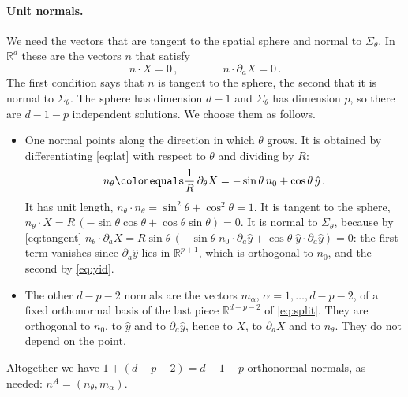 \documentclass[a4paper,11pt]{article}
\begin{document}
\paragraph{Unit normals.}
We need the vectors that are tangent to the spatial sphere and normal to $\Sigma_\theta$. In $\mathbb{R}^d$ these are the vectors $n$ that satisfy
\begin{equation}\label{eq:normalcond}
	n\cdot X=0\, ,\qquad\qquad n\cdot\partial_aX=0\, .
\end{equation}
The first condition says that $n$ is tangent to the sphere, the second that it is normal to $\Sigma_\theta$. The sphere has dimension $d-1$ and $\Sigma_\theta$ has dimension $p$, so there are $d-1-p$ independent solutions. We choose them as follows.
\begin{itemize}
	\item One normal points along the direction in which $\theta$ grows. It is obtained by differentiating \eqref{eq:lat} with respect to $\theta$ and dividing by $R$:
	\begin{equation}\label{eq:ntheta}
		n_\theta\colonequals\frac1R\,\partial_\theta X=-\sin\theta\,n_0+\cos\theta\,\hat y\, .
	\end{equation}
	It has unit length, $n_\theta\cdot n_\theta=\sin^2\theta+\cos^2\theta=1$. It is tangent to the sphere, $n_\theta\cdot X=R\,(-\sin\theta\cos\theta+\cos\theta\sin\theta)=0$. It is normal to $\Sigma_\theta$, because by \eqref{eq:tangent} $n_\theta\cdot\partial_aX=R\sin\theta\,(-\sin\theta\;n_0\cdot\partial_a\hat y+\cos\theta\;\hat y\cdot\partial_a\hat y)=0$: the first term vanishes since $\partial_a\hat y$ lies in $\mathbb{R}^{p+1}$, which is orthogonal to $n_0$, and the second by \eqref{eq:yid}.
	\item The other $d-p-2$ normals are the vectors $m_\alpha$, $\alpha=1,\dots,d-p-2$, of a fixed orthonormal basis of the last piece $\mathbb{R}^{d-p-2}$ of \eqref{eq:split}. They are orthogonal to $n_0$, to $\hat y$ and to $\partial_a\hat y$, hence to $X$, to $\partial_aX$ and to $n_\theta$. They do not depend on the point.
\end{itemize}
Altogether we have $1+(d-p-2)=d-1-p$ orthonormal normals, as needed: $n^A=(n_\theta,m_\alpha)$.
\end{document}
